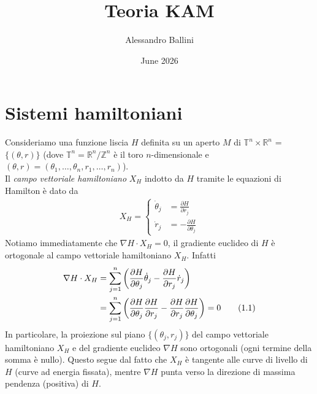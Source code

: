 \documentclass{article}
\title{Teoria KAM}
\author{Alessandro Ballini}
\date{June 2026}
\begin{document}
\maketitle
\tableofcontents
\newpage
\section{Sistemi hamiltoniani}
Consideriamo una funzione liscia $H$ definita su un aperto $M$ di $\mathbb{T}^n \times \mathbb{R}^n$ = $\{(\theta, r)\}$ (dove $\mathbb{T}^n = \mathbb{R}^n/\mathbb{Z}^n$ è il toro $n$-dimensionale e $(\theta, r) = (\theta_1, \dots, \theta_n, r_1, \dots, r_n)$). \\
Il \textit{campo vettoriale hamiltoniano} $X_H$ indotto da $H$ tramite le equazioni di Hamilton è dato da 
\begin{align} X_H =
    \begin{cases}
        \dot{\theta}_j &= \frac{\partial H}{\partial r_j} \\
        \dot{r}_j &= -\frac{\partial H}{\partial \theta_j}
    \end{cases} \tag{1.1}
\end{align}
Notiamo immediatamente che $\nabla H \cdot X_H = 0$, il gradiente euclideo di $H$ è ortogonale al campo vettoriale hamiltoniano $X_H$. Infatti 
\begin{align}
    \nabla H \cdot X_H &= \sum_{j = 1}^n \left(\frac{\partial H}{\partial \theta_j}\dot{\theta}_j - \frac{\partial H}{\partial r_j}\dot{r}_j\right) \notag \\
    &= \sum_{j = 1}^n \left(\frac{\partial H}{\partial \theta_j}\frac{\partial H}{\partial r_j} - \frac{\partial H}{\partial r_j}\frac{\partial H}{\partial \theta_j}\right) = 0 \tag{1.1}
\end{align}
In particolare, la proiezione sul piano $\{(\theta_j, r_j)\}$ del campo vettoriale hamiltoniano $X_H$ e del gradiente euclideo $\nabla H$ sono ortogonali (ogni termine della somma è nullo). Questo segue dal fatto che $X_H$ è tangente alle curve di livello di $H$ (curve ad energia fissata), mentre $\nabla H$ punta verso la direzione di massima pendenza (positiva) di $H$.

\newpage
\end{document}
